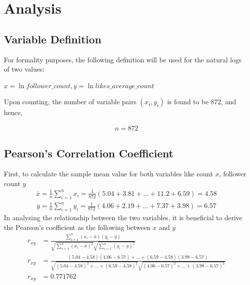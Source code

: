\documentclass[11pt]{article}
\begin{document}
\section{Analysis}\label{section-analysis}

\subsection{Variable Definition}
For formality purposes, the following definition will be used for the natural logs of two values:

$x=\ln{\mathit{follower\_count}}, y=\ln{\mathit{likes\_average\_count}}$

Upon counting, the number of variable pairs $ \left( x _ { i }, y _ { i } \right)$ is found to be $872$, and hence, 

\begin{align}
{n = 872}
\end{align}

\subsection{Pearson's Correlation Coefficient}
First, to calculate the sample mean value for both variables like count $x$, follower count $y$
\begin{align}
\overline { x } = \frac { 1 } { n } \sum _ { i = 1 } ^ { n } x _ { i } = \frac { 1 } { 872 } (5.04 + 3.81 + \ldots + 11.2 + 6.59)  { = 4.58}
\end{align}
\begin{align}
\overline { y } = \frac { 1 } { n } \sum _ { i = 1 } ^ { n } y _ { i }  = \frac { 1 } { 872 } (4.06 + 2.19 + \ldots + 7.37 + 3.98)  {= 6.57}
\end{align}
In analysing the relationship between the two variables, it is beneficial to derive the Pearson's coefficient as the following between $x$ and $y$
\begin{align}
r _ { x y } &= \frac { \sum _ { i = 1 } ^ { n } \left( x _ { i } - \overline { x } \right) \left( y _ { i } - \overline { y } \right) } { \sqrt { \sum _ { i = 1 } ^ { n } \left( x _ { i } - \overline { x } \right) ^ { 2 } } \sqrt { \sum _ { i = 1 } ^ { n } \left( y _ { i } - \overline { y } \right) ^ { 2 } } } \\ 
r _ { x y } &= \frac {\left( 5.04 - 4.58 \right) \left( 4.06 - 6.57\right)  + \ldots + {\left( 6.59 - 4.58 \right) \left( 3.98 - 6.57\right) }}  { \sqrt { \left( 5.04 - 4.58\right) ^ { 2 }  + \ldots +  \left( 6.59 - 4.58\right)^{2}} \sqrt { \left( 4.06 - 6.57\right) ^ { 2 }  + \ldots +  \left( 3.98 - 6.57\right)^{2}} } \\
r _ { x y } &= {0.771762}
\end{align}
\end{document}

